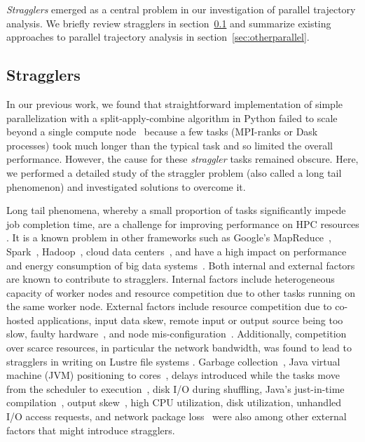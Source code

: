 \label{sec:background}

\emph{Stragglers} emerged as a central problem in our investigation of parallel trajectory analysis. We briefly review stragglers in section~\ref{sec:stragglers} and summarize existing approaches to parallel trajectory analysis in section~\ref{sec:otherparallel}.

\subsection{Stragglers}
\label{sec:stragglers}

In our previous work, we found that straightforward implementation of simple parallelization with a split-apply-combine algorithm  in Python failed to scale beyond a single compute node~\cite{Khoshlessan:2017ab} because a few tasks (MPI-ranks or Dask~\citep{Rocklin:2015aa} processes) took much longer than the typical task and so limited the overall performance.
However, the cause for these \emph{straggler} tasks remained obscure.
Here, we performed a detailed study of the straggler problem (also called a long tail phenomenon) and investigated solutions to overcome it.

Long tail phenomena, whereby a small proportion of tasks significantly impede job completion time, are a challenge for improving performance on HPC resources \cite{Garraghan2016}.
It is a known problem in other frameworks such as Google's MapReduce~\cite{Dean2004}, Spark~\cite{Kyong2017,Ousterhout2017,Gittens2016,Yang2016}, Hadoop~\cite{Dean2004}, cloud data centers~\cite{Schmidt2016, Garraghan2016}, and have a high impact on performance and energy consumption of big data systems~\cite{Tien-2017}.
Both internal and external factors are known to contribute to stragglers. 
Internal factors include heterogeneous capacity of worker nodes and resource competition due to other tasks running on the same worker node.
External factors include resource competition due to co-hosted applications, input data skew, remote input or output source being too slow,  faulty hardware~\cite{Chen2014,Dean2004}, and node mis-configuration~\cite{Dean2004}.
Additionally, competition over scarce resources, in particular the network bandwidth, was found to lead to stragglers in writing on Lustre file systems \cite{Xie:2012aa}.
Garbage collection~\cite{Kyong2017,Ousterhout2017}, Java virtual machine (JVM) positioning to cores~\cite{Kyong2017}, delays introduced while the tasks move from the scheduler to execution~\cite{Gittens2016}, disk I/O during shuffling, Java's just-in-time compilation~\cite{Ousterhout2017}, output skew~\cite{Ousterhout2017}, high CPU utilization, disk utilization, unhandled I/O access requests, and network package loss~\cite{Garraghan2016} were also among other external factors that might introduce stragglers.

